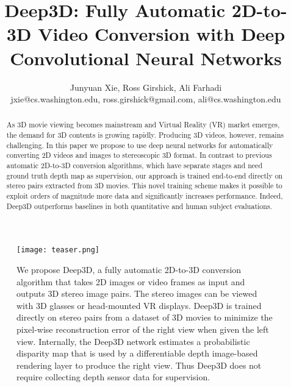 \documentclass[runningheads]{llncs}
\begin{document}
\pagestyle{headings}
\mainmatter
\def\ECCV16SubNumber{866}  %

\title{Deep3D: Fully Automatic 2D-to-3D Video Conversion with Deep Convolutional Neural Networks} %



\author{Junyuan Xie, Ross Girshick, Ali Farhadi\\jxie@cs.washington.edu, ross.girshick@gmail.com, ali@cs.washington.edu}


\maketitle

\begin{figure}[h]
\centering
\texttt{[image: teaser.png]}
\vspace{-0.5in}
\caption{We propose Deep3D, a fully automatic 2D-to-3D conversion algorithm that takes 2D images or video frames as input and outputs 3D stereo image pairs.
The stereo images can be viewed with 3D glasses or head-mounted VR displays.
Deep3D is trained directly on stereo pairs from a dataset of 3D movies to minimize the pixel-wise reconstruction error of the right view when given the left view.
Internally, the Deep3D network estimates a probabilistic disparity map that is used by a differentiable depth image-based rendering layer to produce the right view.
Thus Deep3D does not require collecting depth sensor data for supervision.
}
\label{fig:teaser}
\end{figure}

\begin{abstract}
As 3D movie viewing becomes mainstream and Virtual Reality (VR) market emerges, the demand for 3D contents is growing rapidly.
Producing 3D videos, however, remains challenging.
In this paper we propose to use deep neural networks for automatically converting 2D videos and images to stereoscopic 3D format.
In contrast to previous automatic 2D-to-3D conversion algorithms, which have separate stages and need ground truth depth map as supervision, our approach is trained end-to-end directly on stereo pairs extracted from 3D movies.
This novel training scheme makes it possible to exploit orders of magnitude more data and significantly increases performance.
Indeed, Deep3D outperforms baselines in both quantitative and human subject evaluations.
\end{abstract}
\end{document}
